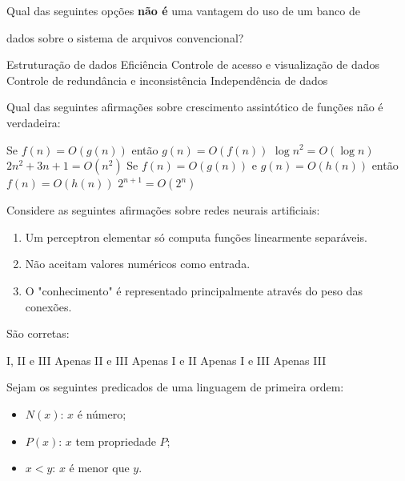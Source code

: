 \documentclass[12pt, addpoints]{exam}
\begin{document}
\begin{questions}
\question

Qual das seguintes opções \textbf{não é} uma vantagem do uso de um banco de

dados sobre o sistema de arquivos convencional?


\begin{choices}
\choice Estruturação de dados
\choice Eficiência
\choice Controle de acesso e visualização de dados
\choice Controle de redundância e inconsistência
\choice Independência de dados
\end{choices}

\question

Qual das seguintes afirmações sobre crescimento assintótico de funções não é verdadeira:
\begin{choices}
\choice Se \( f(n) = O(g(n)) \) então \( g(n) = O(f(n)) \)
\choice \( \log n^2 = O(\log n) \)
\choice \( 2n^2 + 3n + 1 = O(n^2) \)
\choice Se \( f(n) = O(g(n)) \) e \( g(n) = O(h(n)) \) então \( f(n) = O(h(n)) \)
\choice \( 2^{n+1} = O(2^n) \)
\end{choices}

\question

Considere as seguintes afirmações sobre redes neurais artificiais: \begin{enumerate}[label=\Roman*.] \item Um perceptron elementar só computa funções linearmente separáveis. \item Não aceitam valores numéricos como entrada. \item O "conhecimento" é representado principalmente através do peso das conexões. \end{enumerate} São corretas:
\begin{choices}
\choice I, II e III
\choice Apenas II e III
\choice Apenas I e II 
\choice Apenas I e III
\choice Apenas III
\end{choices}

\question

Sejam os seguintes predicados de uma linguagem de primeira ordem:



\begin{itemize}

    \item \( N(x) \): \( x \) é número;

    \item \( P(x) \): \( x \) tem propriedade \( P \);

    \item \( x < y \): \( x \) é menor que \( y \).


\end{itemize}
\end{questions}
\end{document}
